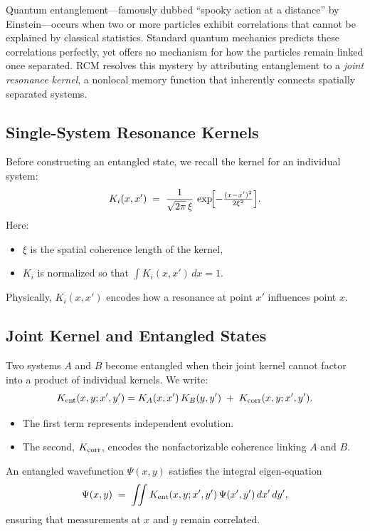 Quantum entanglement—famously dubbed “spooky action at a distance” by Einstein—occurs when two or more particles exhibit correlations that cannot be explained by classical statistics.  Standard quantum mechanics predicts these correlations perfectly, yet offers no mechanism for how the particles remain linked once separated.  RCM resolves this mystery by attributing entanglement to a \emph{joint resonance kernel}, a nonlocal memory function that inherently connects spatially separated systems.

\subsection{Single-System Resonance Kernels}

Before constructing an entangled state, we recall the kernel for an individual system:
\[
K_i(x,x') \;=\; \frac{1}{\sqrt{2\pi}\,\xi}\,\exp\!\Bigl[-\tfrac{(x - x')^2}{2\xi^2}\Bigr].
\]
Here:
\begin{itemize}
  \item \(\xi\) is the spatial coherence length of the kernel,
  \item \(K_i\) is normalized so that \(\displaystyle\int K_i(x,x')\,dx = 1\).
\end{itemize}
Physically, \(K_i(x,x')\) encodes how a resonance at point \(x'\) influences point \(x\).  

\subsection{Joint Kernel and Entangled States}

Two systems \(A\) and \(B\) become entangled when their joint kernel cannot factor into a product of individual kernels.  We write:
\begin{equation}\label{eq:joint_kernel_recap}
K_{\rm ent}(x,y; x',y') 
= K_A(x,x')\,K_B(y,y') 
  \;+\; K_{\rm corr}(x,y; x',y').
\end{equation}
\begin{itemize}
  \item The first term represents independent evolution.
  \item The second, \(K_{\rm corr}\), encodes the nonfactorizable coherence linking \(A\) and \(B\).  
\end{itemize}
An entangled wavefunction \(\Psi(x,y)\) satisfies the integral eigen‐equation
\[
\Psi(x,y) \;=\; \iint K_{\rm ent}(x,y;x',y')\,\Psi(x',y')\,dx'\,dy',
\]
ensuring that measurements at \(x\) and \(y\) remain correlated.

